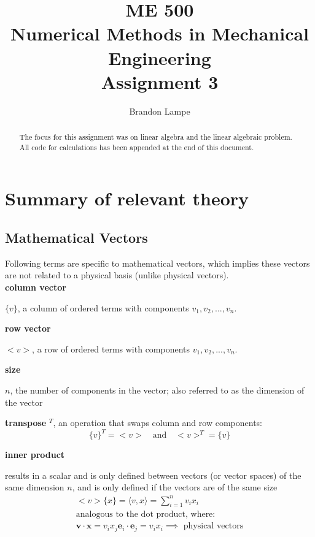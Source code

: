 \documentclass[letterpaper, 10pt, oneside]{article}
\title{ME 500\\ Numerical Methods in Mechanical Engineering\\ Assignment 3}
\author{Brandon Lampe}
\newenvironment{dd}[1]{
	\noindent
	\textbf{\normalsize{#1}}
	\hspace{0.1in}
	\small
	\rmfamily
	}
	{\medskip}
\begin{document}
\maketitle

\begin{abstract}
	The focus for this assignment was on linear algebra and the linear algebraic problem.  All code for calculations has been appended at the end of this document.
\end{abstract}
\section{Summary of relevant theory}
\subsection{Mathematical Vectors\\}
Following terms are specific to mathematical vectors, which implies these vectors are not related to a physical basis (unlike physical vectors).\\

\begin{dd}{column vector}
$\{v \}$, a column of ordered terms with components $v_1, v_2,...,v_n$.
\end{dd}

\begin{dd}{row vector}
$<v>$, a row of ordered terms with components $v_1, v_2,...,v_n$.
\end{dd}

\begin{dd}{size}
$n$, the number of components in the vector; also referred to as the dimension of the vector
\end{dd}

\begin{dd}{transpose} $^T$, an operation that swaps column and row components:
$$\{v\}^T = <v> \quad \text{and} \quad <v>^T = \{v\}$$
\end{dd}

\begin{dd}{inner product}
results in a scalar and is only defined between vectors (or vector spaces) of the same dimension $n$, and is only defined if the vectors are of the same size
	\begin{gather*}
	<v>\{x\} = \langle v,x \rangle   = \sum_{i=1}^n v_i x_i \\ \text{analogous to the dot product, where:} \\
	\mathbf{v \cdot x} = v_i x_j \mathbf{e}_i \cdot \mathbf{e}_j = v_i x_i \implies \text{ physical vectors}
	\end{gather*}
\end{dd}
\end{document}
